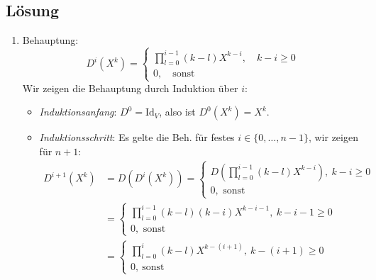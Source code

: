 \subsection{Lösung}
\begin{enumerate}
	\item Behauptung:
	\begin{equation*}
	 	D^i(X^k) = \begin{cases}
	 		\prod_{l=0}^{i-1}(k-l)X^{k-i}, \quad k-i \geq 0 \\
	 		0, \quad \text{sonst}
	 	\end{cases}
	 \end{equation*}
	 Wir zeigen die Behauptung durch Induktion über \( i \):
	 \begin{itemize}
	 	\item \emph{Induktionsanfang}: \( D^0 = \text{Id}_V \), also ist \( D^0(X^k) = X^k \).
	 	\item \emph{Induktionsschritt}: Es gelte die Beh. für festes \( i \in \{ 0, \dots, n-1 \} \), wir zeigen für \( n+1 \): 
	 	\begin{align*}
	 		D^{i+1}(X^k) &= D(D^i(X^k)) = \begin{cases}
	 			D(\prod_{l=0}^{i-1}(k-l)X^{k-i}), \ k-i \geq 0 \\
	 			0, \text{ sonst}
	 		\end{cases} \\
	 		&= \begin{cases}
	 			\prod_{l=0}^{i-1}(k-l)(k-i)X^{k-i-1}, \ k-i-1 \geq 0 \\
	 			0, \text{ sonst}
	 		\end{cases} \\
	 		&= \begin{cases}
	 			\prod_{l=0}^i (k-l)X^{k-(i+1)}, \ k-(i+1) \geq 0 \\
	 			0, \ \text{sonst}
	 		\end{cases}
	 	\end{align*}
	 \end{itemize}

	 \newpage


\end{enumerate}
